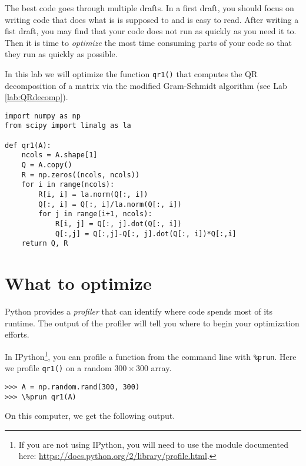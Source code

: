 \label{lab:ProfilingCode}

The best code goes through multiple drafts.
In a first draft, you should focus on writing code that does what is is supposed to and is easy to read.
After writing a fist draft, you may find that your code does not run as quickly as you need it to.
Then it is time to \emph{optimize} the most time consuming parts of your code so that they run as quickly as possible.

In this lab we will optimize the function \texttt{qr1()} that computes the QR decomposition of a matrix via the modified Gram-Schmidt algorithm (see Lab \ref{lab:QRdecomp}).
\begin{lstlisting}
import numpy as np
from scipy import linalg as la

def qr1(A):
    ncols = A.shape[1]
    Q = A.copy()
    R = np.zeros((ncols, ncols))
    for i in range(ncols):
        R[i, i] = la.norm(Q[:, i])
        Q[:, i] = Q[:, i]/la.norm(Q[:, i])
        for j in range(i+1, ncols):
            R[i, j] = Q[:, j].dot(Q[:, i])
            Q[:,j] = Q[:,j]-Q[:, j].dot(Q[:, i])*Q[:,i]
    return Q, R
\end{lstlisting}

\section*{What to optimize}
Python provides a \emph{profiler} that can identify where code spends most of its runtime.
The output of the profiler will tell you where to begin your optimization efforts.

In IPython\footnote{If you are not using IPython, you will need to use the  module documented here: \url{https://docs.python.org/2/library/profile.html}.}, 
you can profile a function from the command line with \texttt{\%prun}.
Here we profile \texttt{qr1()} on a random $300 \times 300$ array.
\begin{lstlisting}
>>> A = np.random.rand(300, 300)
>>> \%prun qr1(A)
\end{lstlisting}

On this computer, we get the following output.


